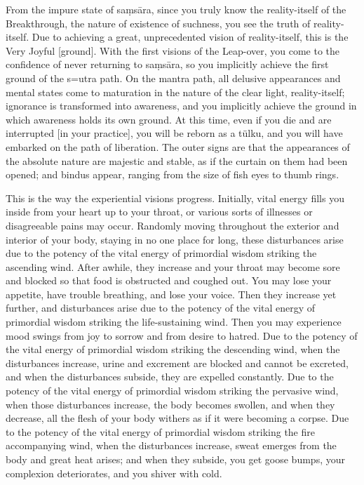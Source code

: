\documentclass[11pt,twocolumn]{article}
\begin{document}
From the impure state of sa\d{m}s\={a}ra, since you truly know the
reality\hyp{}itself of the Breakthrough, the nature of existence of
suchness, you see the truth of reality\hyp{}itself. Due to achieving a
great, unprecedented vision of reality\hyp{}itself, this is the Very
Joyful [ground]. With the first visions of the Leap\hyp{}over, you
come to the confidence of never returning to sa\d{m}s\={a}ra, so you
implicitly achieve the first ground of the s\a={u}tra path. On the
mantra path, all delusive appearances and mental states come to
maturation in the nature of the clear light, reality\hyp{}itself;
ignorance is transformed into awareness, and you implicitly achieve
the ground in which awareness holds its own ground. At this time, even
if you die and are interrupted [in your practice], you will be reborn
as a t\"ulku, and you will have embarked on the path of
liberation. The outer signs are that the appearances of the absolute
nature are majestic and stable, as if the curtain on them had been
opened; and bindus appear, ranging from the size of fish eyes to thumb
rings.

This is the way the experiential visions progress. Initially, vital
energy fills you inside from your heart up to your throat, or various
sorts of illnesses or disagreeable pains may occur. Randomly moving
throughout the exterior and interior of your body, staying in no one
place for long, these disturbances arise due to the potency of the
vital energy of primordial wisdom striking the ascending wind. After
awhile, they increase and your throat may become sore and blocked so
that food is obstructed and coughed out. You may lose your appetite,
have trouble breathing, and lose your voice. Then they increase yet
further, and disturbances arise due to the potency of the vital energy
of primordial wisdom striking the life\hyp{}sustaining wind. Then you
may experience mood swings from joy to sorrow and from desire to
hatred. Due to the potency of the vital energy of primordial wisdom
striking the descending wind, when the disturbances increase, urine
and excrement are blocked and cannot be excreted, and when the
disturbances subside, they are expelled constantly. Due to the potency
of the vital energy of primordial wisdom striking the pervasive wind,
when those disturbances increase, the body becomes swollen, and when
they decrease, all the flesh of your body withers as if it were
becoming a corpse. Due to the potency of the vital energy of
primordial wisdom striking the fire accompanying wind, when the
disturbances increase, sweat emerges from the body and great heat
arises; and when they subside, you get goose bumps, your complexion
deteriorates, and you shiver with cold.
\end{document}
